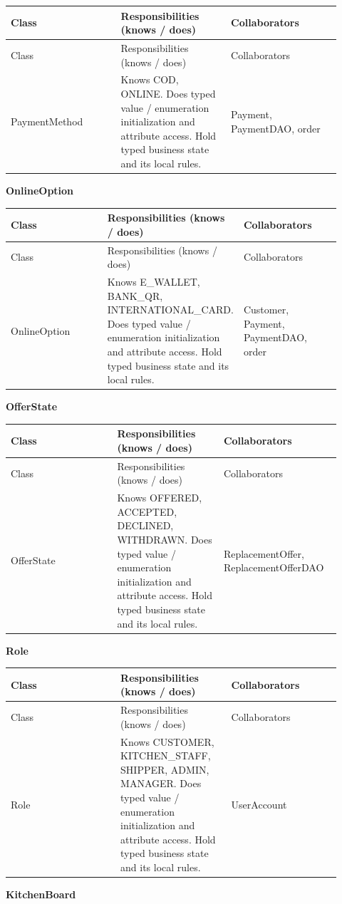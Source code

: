 \begin{longtable}{>{\raggedright\arraybackslash}p{0.3067\linewidth}>{\raggedright\arraybackslash}p{0.3067\linewidth}>{\raggedright\arraybackslash}p{0.3067\linewidth}}
Class & Responsibilities (knows / does) & Collaborators \\
\hline\endfirsthead
Class & Responsibilities (knows / does) & Collaborators \\
\hline\endhead
PaymentMethod & Knows COD, ONLINE. Does typed value / enumeration initialization and attribute access. Hold typed business state and its local rules. & Payment, PaymentDAO, order \\
\end{longtable}
\textbf{OnlineOption}

\begin{longtable}{>{\raggedright\arraybackslash}p{0.3067\linewidth}>{\raggedright\arraybackslash}p{0.3067\linewidth}>{\raggedright\arraybackslash}p{0.3067\linewidth}}
Class & Responsibilities (knows / does) & Collaborators \\
\hline\endfirsthead
Class & Responsibilities (knows / does) & Collaborators \\
\hline\endhead
OnlineOption & Knows E\_WALLET, BANK\_QR, INTERNATIONAL\_CARD. Does typed value / enumeration initialization and attribute access. Hold typed business state and its local rules. & Customer, Payment, PaymentDAO, order \\
\end{longtable}
\textbf{OfferState}

\begin{longtable}{>{\raggedright\arraybackslash}p{0.3067\linewidth}>{\raggedright\arraybackslash}p{0.3067\linewidth}>{\raggedright\arraybackslash}p{0.3067\linewidth}}
Class & Responsibilities (knows / does) & Collaborators \\
\hline\endfirsthead
Class & Responsibilities (knows / does) & Collaborators \\
\hline\endhead
OfferState & Knows OFFERED, ACCEPTED, DECLINED, WITHDRAWN. Does typed value / enumeration initialization and attribute access. Hold typed business state and its local rules. & ReplacementOffer, ReplacementOfferDAO \\
\end{longtable}
\textbf{Role}

\begin{longtable}{>{\raggedright\arraybackslash}p{0.3067\linewidth}>{\raggedright\arraybackslash}p{0.3067\linewidth}>{\raggedright\arraybackslash}p{0.3067\linewidth}}
Class & Responsibilities (knows / does) & Collaborators \\
\hline\endfirsthead
Class & Responsibilities (knows / does) & Collaborators \\
\hline\endhead
Role & Knows CUSTOMER, KITCHEN\_STAFF, SHIPPER, ADMIN, MANAGER. Does typed value / enumeration initialization and attribute access. Hold typed business state and its local rules. & UserAccount \\
\end{longtable}
\textbf{KitchenBoard}

